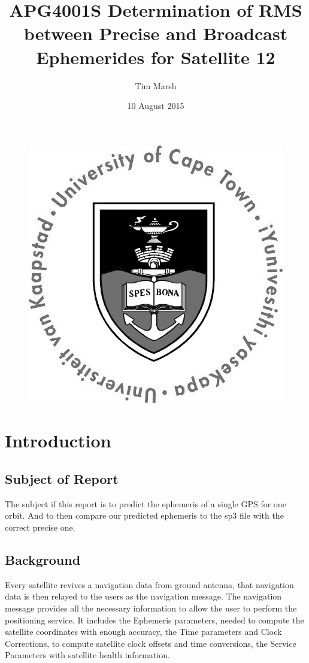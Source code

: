 \documentclass[12pt,a4paper]{article}
\title{APG4001S Determination of RMS between Precise and Broadcast Ephemerides for Satellite 12}
\date{10 August 2015}
\author{Tim Marsh}
\begin{document}
	
	\maketitle
	\begin{figure}[H]
		\centering
		\includegraphics[width=0.7\linewidth]{UCTcircular_logo1_CMYK}
		\label{fig:UCTcircular_logo1_CMYK}
	\end{figure}
	\newpage
	\tableofcontents
	
	\newpage
	\section{Introduction}
		\subsection{Subject of Report}
		The subject if this report is to predict the ephemeris of a single GPS for one orbit. And to then compare our predicted ephemeris to the sp3 file with the correct precise one.
		
		\subsection{Background}
		Every satellite revives a navigation data from ground antenna, that navigation data is then relayed to the users as the navigation message. The navigation message provides all the necessary information to allow the user to perform the positioning service. It includes the Ephemeris parameters, needed to compute the satellite coordinates with enough accuracy, the Time parameters and Clock Corrections, to compute satellite clock offsets and time conversions, the Service Parameters with satellite health information.
		
\end{document}
